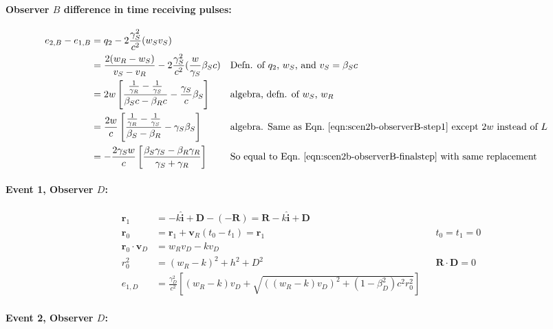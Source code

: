 \documentclass[a4paper]{article}
\theoremstyle{plain}
\theoremstyle{definition}
\newcommand{\vect}[1]{\mathbf{#1}}
\newcommand{\hatvec}[1]{\hat{\mathbf{#1}}}
\begin{document}
\paragraph{Observer $B$ difference in time receiving pulses:}

\begin{align*}
e_{2,B} - e_{1,B}
  & = q_2 - 2\frac{\gamma_S^2}{c^2} (w_S v_S) \\
  & = \frac{2(w_R-w_S)}{v_S - v_R} - 2\frac{\gamma_S^2}{c^2} ( \frac{w}{\gamma_S} \beta_S c ) & & \text{Defn. of $q_2$, $w_S$, and $v_S = \beta_S c$} \\
  & = 2w \left[ \frac{\frac{1}{\gamma_R} - \frac{1}{\gamma_S}}{\beta_S c - \beta_R c} - \frac{\gamma_S}{c} \beta_S \right] & & \text{algebra, defn. of $w_S$, $w_R$} \\
  & = \frac{2w}{c} \left[ \frac{\frac{1}{\gamma_R} - \frac{1}{\gamma_S}}{\beta_S-\beta_R} - \gamma_S \beta_S \right] & & \text{algebra. Same as Eqn.~\eqref{eqn:scen2b-observerB-step1} except $2w$ instead of $L$} \\
  & = -\frac{2\gamma_S w}{c} \left[ \frac{\beta_S\gamma_S - \beta_R\gamma_R}{\gamma_S + \gamma_R} \right] & & \text{So equal to Eqn.~\eqref{eqn:scen2b-observerB-finalstep} with same replacement}
\end{align*}


\paragraph{Event 1, Observer $D$:}

\begin{align}
\vect{r}_1 & = -k\hatvec{i} + \vect{D} - (-\vect{R}) = \vect{R} - k\hatvec{i} + \vect{D} \nonumber \\
\vect{r}_0 & = \vect{r}_1 + \vect{v}_R (t_0 - t_1) = \vect{r}_1 & & \text{$t_0=t_1=0$} \nonumber \\
\vect{r}_0 \cdot \vect{v}_D & = w_Rv_D - kv_D \label{eqn:scen3b-event1d-r0v} \\
r_0^2 & = (w_R-k)^2 + h^2 + D^2 & & \text{$\vect{R} \cdot \vect{D} = 0$} \nonumber \\
e_{1,D} & = \frac{\gamma_D^2}{c^2} \left[ (w_R-k)v_D + \sqrt{ ((w_R-k)v_D)^2 + (1-\beta_D^2)c^2r_0^2 } \right] \nonumber
\end{align}


\paragraph{Event 2, Observer $D$:}
\end{document}
